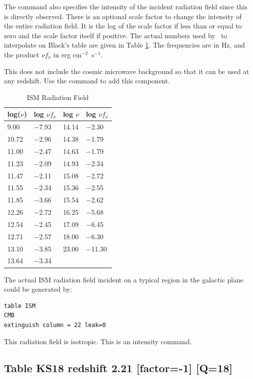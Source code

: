 The  command also specifies the intensity
of the incident radiation field since this is directly observed.
There is an optional scale
factor to change the intensity of the entire radiation field.
It is the
log of the scale factor if less than or equal to zero and the scale factor
itself if positive.
The actual numbers used by \Cloudy\ to interpolate on
Black's table are given in Table \ref{tab:ISM_Black}.
The frequencies are in Hz, and the
product $\nu f_\nu$ in erg cm$^{-2}$~s$^{-1}$.

This does not include the cosmic microwave background so that it can be used at any redshift.
Use the 
command to add this component.

\begin{table}
\centering
\caption{ISM Radiation Field}
\label{tab:ISM_Black}\begin{tabular}{llll}\hline
log($\nu$)& log $\nu f_\nu$& log $\nu$& log $\nu f_{\nu}$\\
\hline
9.00& $-$7.93& 14.14& $-$2.30\\
10.72& $-$2.96& 14.38& $-$1.79\\
11.00& $-$2.47& 14.63& $-$1.79\\
11.23& $-$2.09& 14.93& $-$2.34\\
11.47& $-$2.11& 15.08& $-$2.72\\
11.55& $-$2.34& 15.36& $-$2.55\\
11.85& $-$3.66& 15.54& $-$2.62\\
12.26& $-$2.72& 16.25& $-$5.68\\
12.54& $-$2.45& 17.09& $-$6.45\\
12.71& $-$2.57& 18.00& $-$6.30\\
13.10& $-$3.85& 23.00& $-$11.30\\
13.64& $-$3.34\\
\hline
\end{tabular}
\end{table}
The actual ISM radiation field incident on a typical region in the galactic plane could be generated by:
\begin{verbatim}
table ISM
CMB
extinguish column = 22 leak=0
\end{verbatim}

This radiation field is isotropic.
This is an intensity command.

\subsection{Table KS18 redshift 2.21 [factor=-1] [Q=18]}

